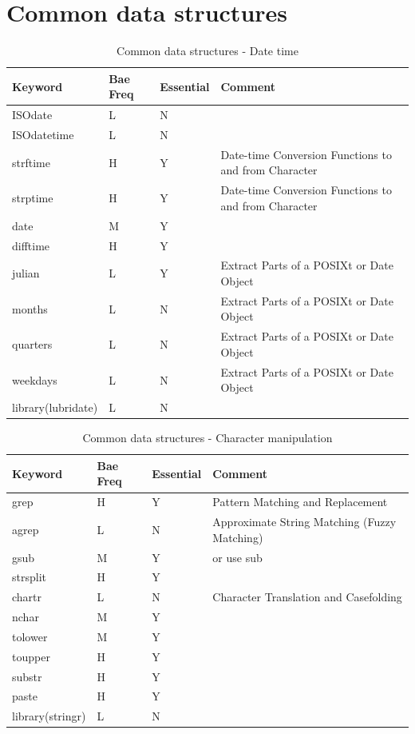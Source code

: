 \documentclass[10pt,]{krantz}
\theoremstyle{definition}
\theoremstyle{definition}
\theoremstyle{remark}
\begin{document}
\section{Common data structures}\label{common-data-structures}

\begin{table}

\caption{\label{tab:knitchunk12}Common data structures - Date time}
\centering
\begin{tabular}[t]{llll}
\toprule
Keyword & Bae Freq & Essential & Comment\\
\midrule
ISOdate & L & N & \\
ISOdatetime & L & N & \\
strftime & H & Y & Date-time Conversion Functions to and from Character\\
strptime & H & Y & Date-time Conversion Functions to and from Character\\
date & M & Y & \\
\addlinespace
difftime & H & Y & \\
julian & L & Y & Extract Parts of a POSIXt or Date Object\\
months & L & N & Extract Parts of a POSIXt or Date Object\\
quarters & L & N & Extract Parts of a POSIXt or Date Object\\
weekdays & L & N & Extract Parts of a POSIXt or Date Object\\
library(lubridate) & L & N & \\
\bottomrule
\end{tabular}
\end{table}

\begin{table}

\caption{\label{tab:knitchunk13}Common data structures - Character manipulation }
\centering
\begin{tabular}[t]{llll}
\toprule
Keyword & Bae Freq & Essential & Comment\\
\midrule
grep & H & Y & Pattern Matching and Replacement\\
agrep & L & N & Approximate String Matching (Fuzzy Matching)\\
gsub & M & Y & or use sub\\
strsplit & H & Y & \\
chartr & L & N & Character Translation and Casefolding\\
\addlinespace
nchar & M & Y & \\
tolower & M & Y & \\
toupper & H & Y & \\
substr & H & Y & \\
paste & H & Y & \\
library(stringr) & L & N & \\
\bottomrule
\end{tabular}
\end{table}
\end{document}

